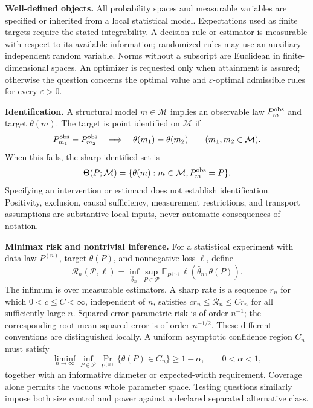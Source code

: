 \documentclass[11pt,a4paper]{article}
\newcommand{\E}{\mathbb E}
\begin{document}
\textbf{Well-defined objects.}
All probability spaces and measurable variables are specified or inherited
from a local statistical model. Expectations used as finite targets require
the stated integrability. A decision rule or estimator is measurable with
respect to its available information; randomized rules may use an auxiliary
independent random variable. Norms without a subscript are Euclidean in
finite-dimensional spaces. An optimizer is requested only when attainment
is assured; otherwise the question concerns the optimal value and
$\varepsilon$-optimal admissible rules for every $\varepsilon>0$.

\textbf{Identification.}
A structural model $m\in\mathcal M$ implies an observable law
$P_m^{\rm obs}$ and target $\theta(m)$. The target is point identified on
$\mathcal M$ if
\[
 P_{m_1}^{\rm obs}=P_{m_2}^{\rm obs}
 \quad\Longrightarrow\quad\theta(m_1)=\theta(m_2)
 \qquad(m_1,m_2\in\mathcal M).
\]
When this fails, the sharp identified set is
\[
 \Theta(P;\mathcal M)=\{\theta(m):m\in\mathcal M,
                                  P_m^{\rm obs}=P\}.
\]
Specifying an intervention or estimand does not establish identification.
Positivity, exclusion, causal sufficiency, measurement restrictions, and
transport assumptions are substantive local inputs, never automatic
consequences of notation.

\textbf{Minimax risk and nontrivial inference.}
For a statistical experiment with data law $P^{(n)}$, target $\theta(P)$,
and nonnegative loss $\ell$, define
\[
 \mathcal R_n(\mathcal P,\ell)
   =\inf_{\widehat\theta_n}\sup_{P\in\mathcal P}
      \E_{P^{(n)}}\ell(\widehat\theta_n,\theta(P)).
\]
The infimum is over measurable estimators. A sharp rate is a sequence
$r_n$ for which $0<c\leq C<\infty$, independent of $n$, satisfies
$c r_n\leq\mathcal R_n\leq C r_n$ for all sufficiently large $n$.
Squared-error parametric risk is of order $n^{-1}$; the corresponding
root-mean-squared error is of order $n^{-1/2}$. These different conventions
are distinguished locally. A uniform asymptotic confidence region $C_n$
must satisfy
\[
 \liminf_{n\to\infty}\inf_{P\in\mathcal P}
     \Pr_{P^{(n)}}\{\theta(P)\in C_n\}\geq 1-\alpha,
 \qquad 0<\alpha<1,
\]
together with an informative diameter or expected-width requirement.
Coverage alone permits the vacuous whole parameter space. Testing questions
similarly impose both size control and power against a declared separated
alternative class.
\end{document}
